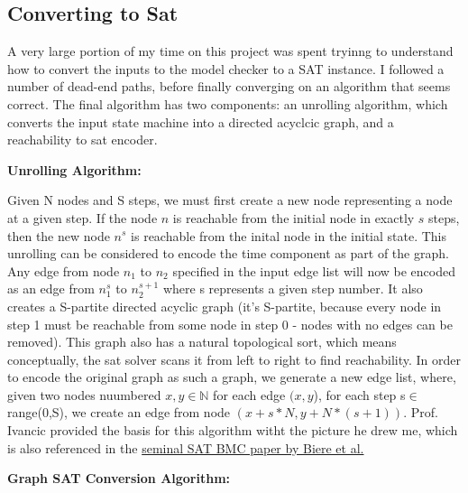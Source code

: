 \documentclass[11pt]{article}
\begin{document}
\begin{flushleft}
\section{Converting to Sat} A very large portion of my time on this project was spent tryinng to understand how to convert the inputs to the model checker to a SAT instance. I followed a number of dead-end paths, before finally converging on an algorithm that seems correct. The final algorithm has two components: an unrolling algorithm, which converts the input state machine into a directed acyclcic graph, and a reachability to sat encoder.\bigskip

{\bf{Unrolling Algorithm:}}\medskip

Given N nodes and S steps, we must first create a new node representing a node at a given step. If the node $n$ is reachable from the initial node in exactly $s$ steps, then the new node $n^s$ is reachable from the inital node in the initial state. This unrolling can be considered to encode the time component as part of the graph. Any edge from node $n_1$ to $n_2$ specified in the input edge list will now be encoded as an edge from $n^s_1$ to $n^{s+1}_2$ where s represents a given step number. It also creates a S-partite directed acyclic graph (it's S-partite, because every node in step 1 must be reachable from some node in step 0 - nodes with no edges can be removed). This graph also has a natural topological sort, which means conceptually, the sat solver scans it from left to right to find reachability. In order to encode the original graph as such a graph, we generate a new edge list, where, given two nodes nuumbered $x,y \in \mathbb{N}$ for each edge $(x,y$), for each step s$\in$ range(0,S), we create an edge from node $(x + s*N, y+N*(s+1))$. Prof. Ivancic provided the basis for this algorithm witht the picture he drew me, which is also referenced in the \href{http://www.cs.cmu.edu/~emc/papers/Books%20and%20Edited%20Volumes/Bounded%20Model%20Checking.pdf"}{seminal SAT BMC paper by Biere et al.}\bigskip

{\bf{Graph SAT Conversion Algorithm:}}\medskip


\end{flushleft}
\end{document}
